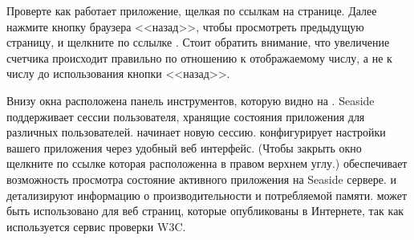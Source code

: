 \documentclass[a4paper,10pt,twoside]{book}
\begin{document}

\noindent
Проверте как работает приложение, щелкая по ссылкам на странице.
Далее нажмите кнопку браузера <<назад>>,
чтобы просмотреть предыдущую страницу,
и щелкните по сслылке \link{++}.
Стоит обратить внимание, что увеличение счетчика происходит правильно по отношению к отображаемому числу, а не к числу до использования кнопки <<назад>>.



Внизу окна расположена панель инструментов,
которую видно на .
Seaside поддерживает сессии пользователя,
хранящие состояния приложения для различных пользователей.
 начинает новую сессию.
 конфигурирует настройки вашего приложения
через удобный веб интерфейс.
(Чтобы закрыть окно  щелкните по ссылке 
которая расположенна в правом верхнем углу.)
 обеспечивает возможность просмотра
состояние активного приложения на Seaside сервере.
 и  детализируют информацию о
производительности и потребляемой памяти.
 может быть использовано для веб страниц, которые опубликованы в Интернете, так как используется сервис проверки W3C.
\end{document}
